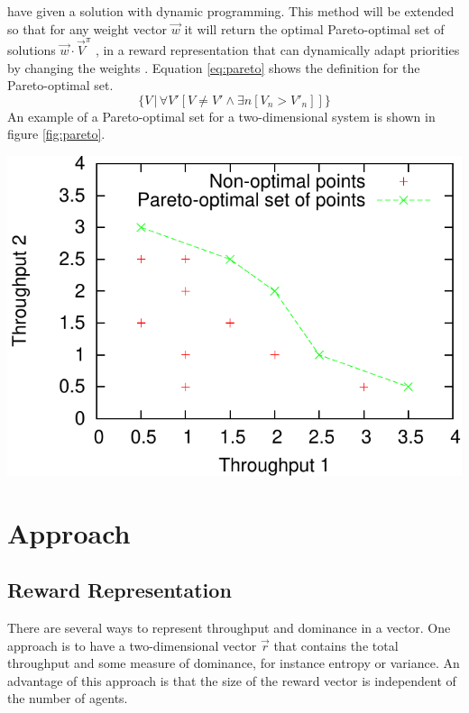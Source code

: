\documentclass{article}
\makeatletter
\newenvironment{figurehere}
{\def\@captype{figure}}
{}
\makeatother
\begin{document}
\begin{multicols}{2}
	\citet{hansen2004dynamic} have given a solution with dynamic programming.
	This method will be extended so that for any weight vector $\vec{w}$ it will
	return the optimal Pareto-optimal set of solutions $\vec{w} \cdot
	\vec{V}^\pi$ \citep{vamplew2011empirical}, in a reward representation that
	can dynamically adapt priorities by changing the weights
	\citep{barrett2008learning,natarajan2005dynamic}.
	Equation \ref{eq:pareto} shows the definition for the Pareto-optimal set.
	\begin{equation}
		\label{eq:pareto}
		\Big\{ V\, \Big| \, \forall V'[ V \neq V' \land \exists n [V_n > V'_n]] \Big\}
	\end{equation}
	An example of a Pareto-optimal set for a two-dimensional system is shown in
	figure \ref{fig:pareto}.

	\begin{figurehere}
		\centering
		\includegraphics[scale=0.68]{images/pareto}
	   \label{fig:pareto}
	\end{figurehere}


	\section{Approach}
	\label{sec:approach}

		\subsection{Reward Representation}
		\label{sub:reward_representation}
		There are several ways to represent throughput and dominance in a vector.
		One approach is to have a two-dimensional vector $\vec{r}$ that contains
		the total throughput and some measure of dominance, for instance entropy
		or variance. An advantage of this approach is that the size of the reward
		vector is independent of the number of agents.


\end{multicols}
\end{document}

